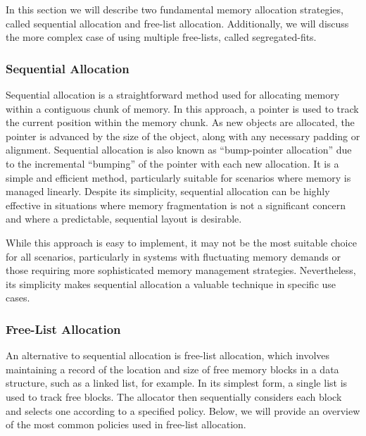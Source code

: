 
In this section we will describe two fundamental memory allocation strategies, called sequential allocation and free-list allocation. Additionally, we will discuss the more complex case of using multiple free-lists, called segregated-fits.

\subsubsection{Sequential Allocation}

Sequential allocation is a straightforward method used for allocating memory within a contiguous chunk of memory. In this approach, a pointer is used to track the current position within the memory chunk. As new objects are allocated, the pointer is advanced by the size of the object, along with any necessary padding or alignment. Sequential allocation is also known as ``bump-pointer allocation'' due to the incremental ``bumping'' of the pointer with each new allocation. It is a simple and efficient method, particularly suitable for scenarios where memory is managed linearly. Despite its simplicity, sequential allocation can be highly effective in situations where memory fragmentation is not a significant concern and where a predictable, sequential layout is desirable.

While this approach is easy to implement, it may not be the most suitable choice for all scenarios, particularly in systems with fluctuating memory demands or those requiring more sophisticated memory management strategies. Nevertheless, its simplicity makes sequential allocation a valuable technique in specific use cases.

\subsubsection{Free-List Allocation}
An alternative to sequential allocation is free-list allocation, which involves maintaining a record of the location and size of free memory blocks in a data structure, such as a linked list, for example. In its simplest form, a single list is used to track free blocks. The allocator then sequentially considers each block and selects one according to a specified policy. Below, we will provide an overview of the most common policies used in free-list allocation.

